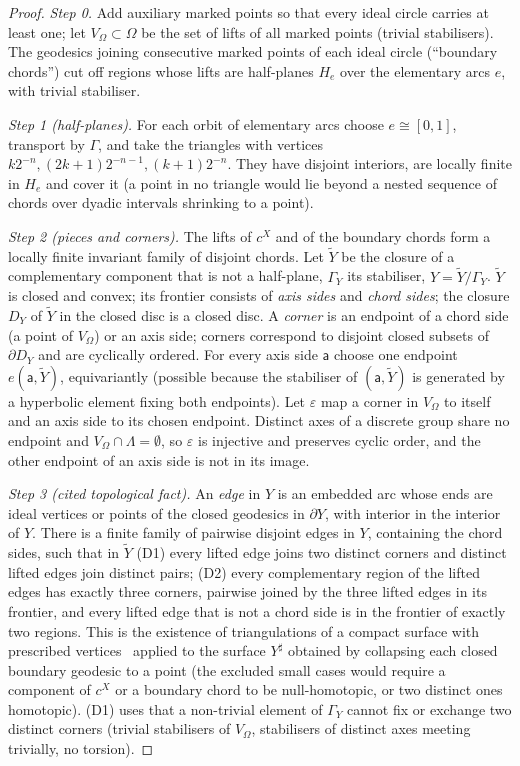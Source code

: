 \documentclass[aps,prd,onecolumn,superscriptaddress,nofootinbib,amsmath,amssymb,11pt]{revtex4-2}
\theoremstyle{definition}
\begin{document}
\begin{proof}
\emph{Step 0.} Add auxiliary marked points so that every ideal circle carries at least one; let $V_\Omega\subset\Omega$ be the set
of lifts of all marked points (trivial stabilisers). The geodesics joining consecutive marked points of each ideal circle
(``boundary chords'') cut off regions whose lifts are half-planes $H_e$ over the elementary arcs $e$, with trivial
stabiliser.

\emph{Step 1 (half-planes).} For each orbit of elementary arcs choose $e\cong[0,1]$, transport by $\Gamma$, and take the
triangles with vertices $k2^{-n},(2k+1)2^{-n-1},(k+1)2^{-n}$. They have disjoint interiors, are locally finite in $H_e$ and
cover it (a point in no triangle would lie beyond a nested sequence of chords over dyadic intervals shrinking to a point).

\emph{Step 2 (pieces and corners).} The lifts of $c^X$ and of the boundary chords form a locally finite invariant family of
disjoint chords. Let $\tilde Y$ be the closure of a complementary component that is not a half-plane, $\Gamma_Y$ its stabiliser,
$Y=\tilde Y/\Gamma_Y$. $\tilde Y$ is closed and convex; its frontier consists of \emph{axis sides} and \emph{chord sides}; the
closure $D_Y$ of $\tilde Y$ in the closed disc is a closed disc. A \emph{corner} is an endpoint of a chord side (a point of
$V_\Omega$) or an axis side; corners correspond to disjoint closed subsets of $\partial D_Y$ and are cyclically ordered. For
every axis side $\mathsf a$ choose one endpoint $e(\mathsf a,\tilde Y)$, equivariantly (possible because the stabiliser of
$(\mathsf a,\tilde Y)$ is generated by a hyperbolic element fixing both endpoints). Let $\varepsilon$ map a corner in $V_\Omega$ to
itself and an axis side to its chosen endpoint. Distinct axes of a discrete group share no endpoint and
$V_\Omega\cap\Lambda=\emptyset$, so $\varepsilon$ is injective and preserves cyclic order, and the other endpoint of an axis side
is not in its image.

\emph{Step 3 (cited topological fact).} An \emph{edge} in $Y$ is an embedded arc whose ends are ideal vertices or points of
the closed geodesics in $\partial Y$, with interior in the interior of $Y$. There is a finite family of pairwise disjoint edges
in $Y$, containing the chord sides, such that in $\tilde Y$ (D1) every lifted edge joins two distinct corners and distinct
lifted edges join distinct pairs; (D2) every complementary region of the lifted edges has exactly three corners, pairwise
joined by the three lifted edges in its frontier, and every lifted edge that is not a chord side is in the frontier of
exactly two regions. This is the existence of triangulations of a compact surface with prescribed
vertices~\cite{Hatcher1991} applied to the surface $Y^\sharp$ obtained by collapsing each closed boundary geodesic to a point
(the excluded small cases would require a component of $c^X$ or a boundary chord to be null-homotopic, or two distinct ones
homotopic). (D1) uses that a non-trivial element of $\Gamma_Y$ cannot fix or exchange two distinct corners (trivial
stabilisers of $V_\Omega$, stabilisers of distinct axes meeting trivially, no torsion).


\end{proof}
\end{document}
